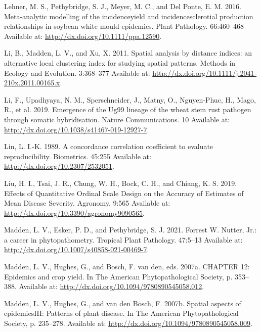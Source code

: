 \documentclass[
  letterpaper,
]{book}
\newlength{\cslhangindent}
\newlength{\cslentryspacingunit} %
\newenvironment{CSLReferences}[2] %
 {%
  \setlength{\parindent}{0pt}
  \ifodd #1
  \let\oldpar\par
  \def\par{\hangindent=\cslhangindent\oldpar}
  \fi
  \setlength{\parskip}{#2\cslentryspacingunit}
 }%
 {}
\begin{document}
\begin{CSLReferences}{0}{0}
\leavevmode{}%
Lehner, M. S., Pethybridge, S. J., Meyer, M. C., and Del Ponte, E. M.
2016. Meta{-}analytic modelling of the incidence{\textendash}yield and
incidence{\textendash}sclerotial production relationships in soybean
white mould epidemics. Plant Pathology. 66:460--468 Available at:
\url{http://dx.doi.org/10.1111/ppa.12590}.

\leavevmode{}%
Li, B., Madden, L. V., and Xu, X. 2011. Spatial analysis by distance
indices: an alternative local clustering index for studying spatial
patterns. Methods in Ecology and Evolution. 3:368--377 Available at:
\url{http://dx.doi.org/10.1111/j.2041-210x.2011.00165.x}.

\leavevmode{}%
Li, F., Upadhyaya, N. M., Sperschneider, J., Matny, O., Nguyen-Phuc, H.,
Mago, R., et al. 2019. Emergence of the Ug99 lineage of the wheat stem
rust pathogen through somatic hybridisation. Nature Communications. 10
Available at: \url{http://dx.doi.org/10.1038/s41467-019-12927-7}.

\leavevmode{}%
Lin, L. I.-K. 1989. A concordance correlation coefficient to evaluate
reproducibility. Biometrics. 45:255 Available at:
\url{http://dx.doi.org/10.2307/2532051}.

\leavevmode{}%
Liu, H. I., Tsai, J. R., Chung, W. H., Bock, C. H., and Chiang, K. S.
2019. Effects of Quantitative Ordinal Scale Design on the Accuracy of
Estimates of Mean Disease Severity. Agronomy. 9:565 Available at:
\url{http://dx.doi.org/10.3390/agronomy9090565}.

\leavevmode{}%
Madden, L. V., Esker, P. D., and Pethybridge, S. J. 2021. Forrest W.
Nutter, Jr.: a career in phytopathometry. Tropical Plant Pathology.
47:5--13 Available at:
\url{http://dx.doi.org/10.1007/s40858-021-00469-7}.

\leavevmode{}%
Madden, L. V., Hughes, G., and Bosch, F. van den, eds. 2007a. CHAPTER
12: Epidemics and crop yield. In The American Phytopathological Society,
p. 353--388. Available at:
\url{http://dx.doi.org/10.1094/9780890545058.012}.

\leavevmode{}%
Madden, L. V., Hughes, G., and van den Bosch, F. 2007b. Spatial aspects
of epidemics{\textemdash}III: Patterns of plant disease. In The American
Phytopathological Society, p. 235--278. Available at:
\url{http://dx.doi.org/10.1094/9780890545058.009}.


\end{CSLReferences}
\end{document}
